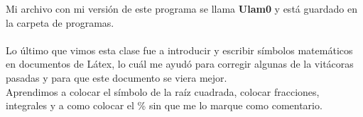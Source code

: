 \documentclass{article}
\begin{document}
	Mi archivo con mi versión de este programa se llama \textbf{Ulam0} y está guardado en la carpeta de programas.\\ \\
	Lo último que vimos esta clase fue a introducir y escribir símbolos matemáticos en documentos de Látex, lo cuál me ayudó para corregir algunas de la vitácoras pasadas y para que este documento se viera mejor.\\
	Aprendimos a colocar el símbolo de la raíz cuadrada, colocar fracciones, integrales y a como colocar el \% sin que me lo marque como comentario.
\end{document}

